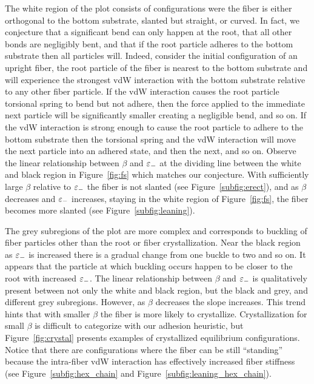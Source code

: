The white region of the plot consists of configurations were the fiber is either orthogonal to the bottom substrate, slanted but straight, or curved.
In fact, we conjecture that a significant bend can only happen at the root, that all other bonds are negligibly bent, and that if the root particle adheres to the bottom substrate then all particles will.
Indeed, consider the initial configuration of an upright fiber, the root particle of the fiber is nearest to the bottom substrate and will experience the strongest vdW interaction with the bottom substrate relative to any other fiber particle.
If the vdW interaction causes the root particle torsional spring to bend but not adhere, then the force applied to the immediate next particle will be significantly smaller creating a negligible bend, and so on.
If the vdW interaction is strong enough to cause the root particle to adhere to the bottom substrate then the torsional spring and the vdW interaction will move the next particle into an adhered state, and then the next, and so on.
Observe the linear relationship between $\beta$ and $\varepsilon_-$ at the dividing line between the white and black region in Figure~\ref{fig:fs} which matches our conjecture.
With sufficiently large $\beta$ relative to $\varepsilon_-$ the fiber is not slanted (see Figure~\ref{subfig:erect}), and as $\beta$ decreases and $\varepsilon_-$ increases, staying in the white region of Figure~\ref{fig:fs}, the fiber becomes more slanted (see Figure~\ref{subfig:leaning}).

\enlargethispage{-\baselineskip}
The grey subregions of the plot are more complex and corresponds to buckling of fiber particles other than the root or fiber crystallization. Near the black region as $\varepsilon_-$ is increased there is a gradual change from one buckle to two and so on. It appears that the particle at which buckling occurs happen to be closer to the root with increased $\varepsilon_-$. The linear relationship between $\beta$ and $\varepsilon_-$ is qualitatively present between not only the white and black region, but the black and grey, and different grey subregions. However, as $\beta$ decreases the slope increases. This trend hints that with smaller $\beta$ the fiber is more likely to crystallize. Crystallization for small $\beta$ is difficult to categorize with our adhesion heuristic, but Figure~\ref{fig:crystal} presents examples of  crystallized equilibrium configurations. Notice that there are configurations where the fiber can be still ``standing'' because the intra-fiber vdW interaction has effectively increased fiber stiffness (see Figure~\ref{subfig:hex_chain} and Figure~\ref{subfig:leaning_hex_chain}).

